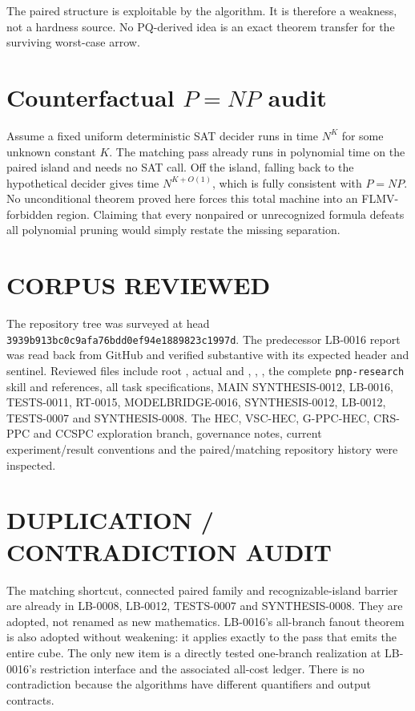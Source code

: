 \documentclass[11pt]{article}
\begin{document}
The paired structure is exploitable by the algorithm.  It is therefore a
weakness, not a hardness source.  No PQ-derived idea is an exact theorem
transfer for the surviving worst-case arrow.

\section{Counterfactual $P=NP$ audit}

Assume a fixed uniform deterministic SAT decider runs in time $N^K$ for some
unknown constant $K$.  The matching pass already runs in polynomial time on
the paired island and needs no SAT call.  Off the island, falling back to the
hypothetical decider gives time $N^{K+O(1)}$, which is fully consistent with
$P=NP$.  No unconditional theorem proved here forces this total machine into
an FLMV-forbidden region.  Claiming that every nonpaired or unrecognized
formula defeats all polynomial pruning would simply restate the missing
separation.

\section{CORPUS REVIEWED}

The repository tree was surveyed at head
\texttt{3939b913bc0c9afa76bdd0ef94e1889823c1997d}.  The predecessor LB-0016
report was read back from GitHub and verified substantive with its expected
header and sentinel.  Reviewed files include root , actual
 and , ,
, the complete \texttt{pnp-research} skill and references,
all task specifications, MAIN SYNTHESIS-0012, LB-0016, TESTS-0011, RT-0015,
MODELBRIDGE-0016, SYNTHESIS-0012, LB-0012, TESTS-0007 and SYNTHESIS-0008.
The HEC, VSC-HEC, G-PPC-HEC, CRS-PPC and CCSPC exploration branch,
governance notes, current experiment/result conventions and the
paired/matching repository history were inspected.

\section{DUPLICATION / CONTRADICTION AUDIT}

The matching shortcut, connected paired family and recognizable-island
barrier are already in LB-0008, LB-0012, TESTS-0007 and SYNTHESIS-0008.
They are adopted, not renamed as new mathematics.  LB-0016's all-branch
fanout theorem is also adopted without weakening: it applies exactly to the
pass that emits the entire cube.  The only new item is a directly tested
one-branch realization at LB-0016's restriction interface and the associated
all-cost ledger.  There is no contradiction because the algorithms have
different quantifiers and output contracts.
\end{document}
